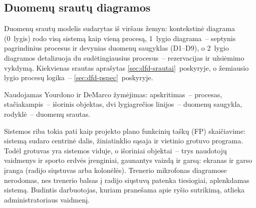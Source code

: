 

\subsection{Duomenų srautų diagramos}\label{sec:dfd}

Duomenų srautų modelis sudarytas iš viršaus žemyn: kontekstinė diagrama
(0~lygis) rodo visą sistemą kaip vieną procesą, 1~lygio diagrama~– septynis
pagrindinius procesus ir devynias duomenų saugyklas (D1--D9), o 2~lygio diagramos
detalizuoja du sudėtingiausius procesus~– rezervacijas ir užsiėmimo vykdymą.
Kiekvienas srautas aprašytas \ref{sec:dfd-srautai}~poskyryje, o žemiausio
lygio procesų logika~– \ref{sec:dfd-pspec}~poskyryje.

Naudojamas Yourdono ir DeMarco žymėjimas: apskritimas~– procesas,
stačiakampis~– išorinis objektas, dvi lygiagrečios linijos~– duomenų
saugykla, rodyklė~– duomenų srautas.

Sistemos riba tokia pati kaip projekto plano funkcinių taškų (FP) skaičiavime:
sistemą sudaro centrinė dalis, žiniatinklio sąsaja ir vietinio grotuvo
programa. Todėl grotuvas yra sistemos viduje, o išoriniai objektai~– trys
naudotojų vaidmenys ir sporto erdvės įrenginiai, gaunantys vaizdą ir garsą:
ekranas ir garso įranga (radijo siųstuvas arba kolonėlės). Trenerio
mikrofonas diagramose nerodomas, nes trenerio balsas į radijo siųstuvą
patenka tiesiogiai, aplenkdamas sistemą. Budintis darbuotojas, kuriam pranešama apie
ryšio sutrikimą, atlieka administratoriaus vaidmenį.

